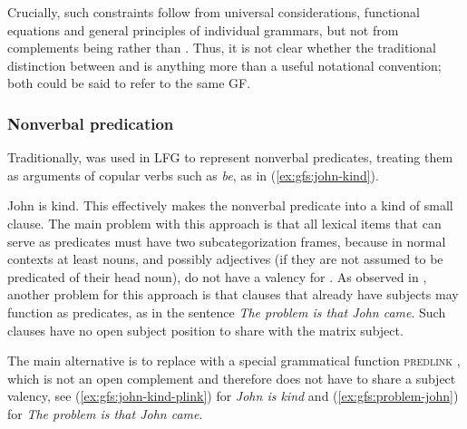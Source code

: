 \documentclass[output=paper]{../langscibook}
\begin{document}
 Crucially, such constraints follow from universal considerations, functional equations and general principles of individual grammars, but not from complements being \XCOMP rather than \COMP. Thus, it is not clear whether the traditional distinction between \COMP and \XCOMP is anything more than a useful notational convention; both could be said to refer to the same GF.
 
\subsubsection{Nonverbal predication\label{sect:gfs:nvpred}} Traditionally, \XCOMP was used in LFG to represent nonverbal predicates, treating them as arguments of copular verbs such as \emph{be}, as in (\ref{ex:gfs:john-kind}).

\ea\label{ex:gfs:john-kind}
\ea John is kind.
\ex
{}
\z
\z
This effectively makes the nonverbal predicate into a kind of small clause. The main problem with this approach is that all lexical items that can serve as predicates must have two subcategorization frames, because in normal contexts at least nouns, and possibly adjectives (if they are not assumed to be predicated of their head noun), do not have a valency for \SUBJ. As observed in \citet{dalrympleetal04copular}, another problem for this approach is that clauses that already have subjects may function as predicates, as in the sentence \textit{The problem is that John came}. Such clauses have no open subject position to share with the matrix subject.
 
 The main alternative is to replace \XCOMP with a special grammatical function \textsc{predlink} \citep{ButtEtAl1999}, which is not an open complement \GF and therefore does not have to share a subject valency, see (\ref{ex:gfs:john-kind-plink}) for \textit{John is kind} and (\ref{ex:gfs:problem-john}) for \textit{The problem is that John came}.

 
\end{document}
